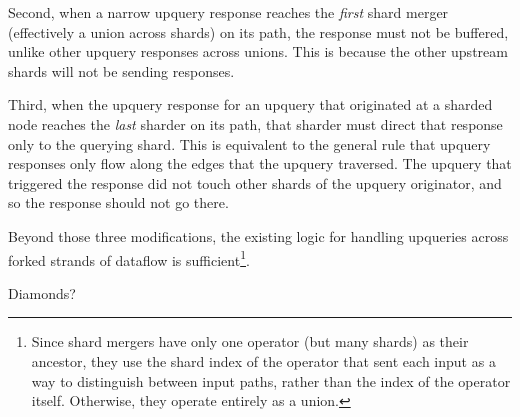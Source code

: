Second, when a narrow upquery response reaches the \emph{first} shard merger
(effectively a union across shards) on its path, the response must not be
buffered, unlike other upquery responses across unions. This is because
the other upstream shards will not be sending responses.

Third, when the upquery response for an upquery that originated at a sharded
node reaches the \emph{last} sharder on its path, that sharder must direct that
response only to the querying shard. This is equivalent to the general rule that
upquery responses only flow along the edges that the upquery traversed. The
upquery that triggered the response did not touch other shards of the upquery
originator, and so the response should not go there.

Beyond those three modifications, the existing logic for handling upqueries
across forked strands of dataflow is sufficient\footnote{Since shard mergers
have only one operator (but many shards) as their ancestor, they use the shard
index of the operator that sent each input as a way to distinguish between input
paths, rather than the index of the operator itself. Otherwise, they operate
entirely as a union.}.

\begin{inprogress}
  Diamonds?
\end{inprogress}
